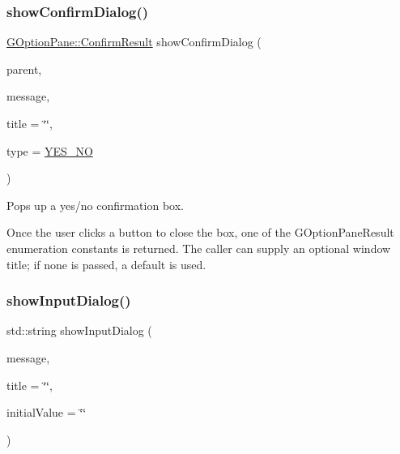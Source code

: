\subsubsection{\texorpdfstring{show\+Confirm\+Dialog()}{showConfirmDialog()}\hspace{0.1cm}{\footnotesize\ttfamily [3/3]}}
{\footnotesize\ttfamily \mbox{\hyperlink{classGOptionPane_a1cc9e8685029e39646671ed71f32d47d}{G\+Option\+Pane\+::\+Confirm\+Result}} show\+Confirm\+Dialog (\begin{DoxyParamCaption}\item[{Q\+Widget $\ast$}]{parent,  }\item[{const std\+::string \&}]{message,  }\item[{const std\+::string \&}]{title = {\ttfamily \char`\"{}\char`\"{}},  }\item[{\mbox{\hyperlink{classGOptionPane_a6a1aaf19c06f5a6bef89ea6415547049}{Confirm\+Type}}}]{type = {\ttfamily \mbox{\hyperlink{classGOptionPane_a6a1aaf19c06f5a6bef89ea6415547049a23d16d66a433471aa62deadacecfc08d}{Y\+E\+S\+\_\+\+NO}}} }\end{DoxyParamCaption})\hspace{0.3cm}{\ttfamily [static]}}



Pops up a yes/no confirmation box. 

Once the user clicks a button to close the box, one of the G\+Option\+Pane\+Result enumeration constants is returned. The caller can supply an optional window title; if none is passed, a default is used. \mbox{\label{classGOptionPane_a50fdc381453e6b8c495e3f9fe07b7bec}} 
\subsubsection{\texorpdfstring{show\+Input\+Dialog()}{showInputDialog()}\hspace{0.1cm}{\footnotesize\ttfamily [1/3]}}
{\footnotesize\ttfamily std\+::string show\+Input\+Dialog (\begin{DoxyParamCaption}\item[{const std\+::string \&}]{message,  }\item[{const std\+::string \&}]{title = {\ttfamily \char`\"{}\char`\"{}},  }\item[{const std\+::string \&}]{initial\+Value = {\ttfamily \char`\"{}\char`\"{}} }\end{DoxyParamCaption})\hspace{0.3cm}{\ttfamily [static]}}



